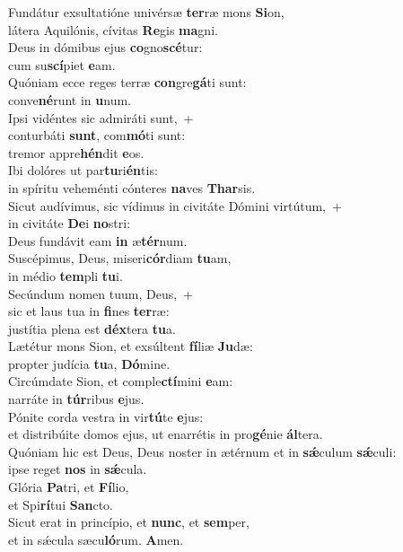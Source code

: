 \evenverse Fundátur exsultatióne univérsæ \textbf{ter}ræ mons \textbf{Si}on,~\*\\
\evenverse látera Aquilónis, cívitas \textbf{Re}gis \textbf{ma}gni.\\
\oddverse Deus in dómibus ejus \textbf{co}gno\textbf{scé}tur:~\*\\
\oddverse cum su\textbf{scí}piet \textbf{e}am.\\
\evenverse Quóniam ecce reges terræ \textbf{con}gre\textbf{gá}ti sunt:~\*\\
\evenverse conve\textbf{né}runt in \textbf{u}num.\\
\oddverse Ipsi vidéntes sic admiráti sunt,~+\\
\oddverse  conturbáti \textbf{sunt}, com\textbf{mó}ti sunt:~\*\\
\oddverse tremor appre\textbf{hén}dit \textbf{e}os.\\
\evenverse Ibi dolóres ut par\textbf{tu}ri\textbf{én}tis:~\*\\
\evenverse in spíritu veheménti cónteres \textbf{na}ves \textbf{Thar}sis.\\
\oddverse Sicut audívimus, sic vídimus in civitáte Dómini virtútum,~+\\
\oddverse  in civitáte \textbf{De}i \textbf{no}stri:~\*\\
\oddverse Deus fundávit eam \textbf{in} æ\textbf{tér}num.\\
\evenverse Suscépimus, Deus, miseri\textbf{cór}diam \textbf{tu}am,~\*\\
\evenverse in médio \textbf{tem}pli \textbf{tu}i.\\
\oddverse Secúndum nomen tuum, Deus,~+\\
\oddverse  sic et laus tua in \textbf{fi}nes \textbf{ter}ræ:~\*\\
\oddverse justítia plena est \textbf{déx}tera \textbf{tu}a.\\
\evenverse Lætétur mons Sion, et exsúltent \textbf{fí}liæ \textbf{Ju}dæ:~\*\\
\evenverse propter judícia \textbf{tu}a, \textbf{Dó}mine.\\
\oddverse Circúmdate Sion, et comple\textbf{ctí}mini \textbf{e}am:~\*\\
\oddverse narráte in \textbf{túr}ribus \textbf{e}jus.\\
\evenverse Pónite corda vestra in vir\textbf{tú}te \textbf{e}jus:~\*\\
\evenverse et distribúite domos ejus, ut enarrétis in pro\textbf{gé}nie \textbf{ál}tera.\\
\oddverse Quóniam hic est Deus, Deus noster in ætérnum et in \textbf{sǽ}culum \textbf{sǽ}culi:~\*\\
\oddverse ipse reget \textbf{nos} in \textbf{sǽ}cula.\\
\evenverse Glória \textbf{Pa}tri, et \textbf{Fí}lio,~\*\\
\evenverse et Spi\textbf{rí}tui \textbf{San}cto.\\
\oddverse Sicut erat in princípio, et \textbf{nunc}, et \textbf{sem}per,~\*\\
\oddverse et in sǽcula sæcu\textbf{ló}rum. \textbf{A}men.\\
